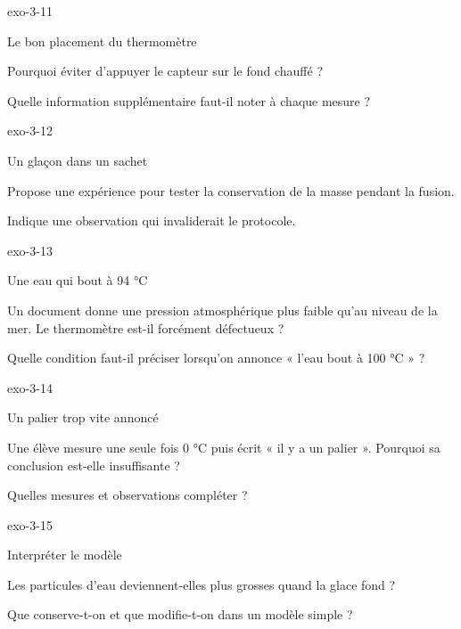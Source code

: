 \documentclass[12pt,twoside,openany]{book}
\begin{document}
\begin{blocLivre}{exo-3-11}
\begin{exercice}[2]{Le bon placement du thermomètre}
\begin{questions}
\item Pourquoi éviter d’appuyer le capteur sur le fond chauffé ?
\item Quelle information supplémentaire faut-il noter à chaque mesure ?
\end{questions}
\end{exercice}\end{blocLivre}
\begin{blocLivre}{exo-3-12}
\begin{exercice}[3]{Un glaçon dans un sachet}
\begin{questions}
\item Propose une expérience pour tester la conservation de la masse pendant la fusion.
\item Indique une observation qui invaliderait le protocole.
\end{questions}
\end{exercice}\end{blocLivre}
\begin{blocLivre}{exo-3-13}
\begin{exercice}[3]{Une eau qui bout à 94 °C}
\begin{questions}
\item Un document donne une pression atmosphérique plus faible qu’au niveau de la mer. Le thermomètre est-il forcément défectueux ?
\item Quelle condition faut-il préciser lorsqu’on annonce « l’eau bout à 100 °C » ?
\end{questions}
\end{exercice}\end{blocLivre}
\begin{blocLivre}{exo-3-14}
\begin{exercice}[3]{Un palier trop vite annoncé}
\begin{questions}
\item Une élève mesure une seule fois 0 °C puis écrit « il y a un palier ». Pourquoi sa conclusion est-elle insuffisante ?
\item Quelles mesures et observations compléter ?
\end{questions}
\end{exercice}\end{blocLivre}
\begin{blocLivre}{exo-3-15}
\begin{exercice}[3]{Interpréter le modèle}
\begin{questions}
\item Les particules d’eau deviennent-elles plus grosses quand la glace fond ?
\item Que conserve-t-on et que modifie-t-on dans un modèle simple ?
\end{questions}
\end{exercice}\end{blocLivre}
\end{document}
